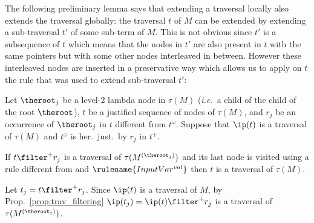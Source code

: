 The following preliminary lemma says that extending a traversal locally also extends the
traversal globally: the traversal $t$ of $M$ can be extended by
extending a sub-traversal $t'$ of some sub-term of $M$. This is
not obvious since $t'$ is a subsequence of $t$ which means that the
nodes in $t'$ are also present in $t$ with the same pointers but
with some other nodes interleaved in between. However these
interleaved nodes are inserted in a preservative way which allows us
to apply on $t$ the rule that was used to extend sub-traversal $t'$:
\begin{lemma}
\label{lem:subtraversal_progression} Let $\theroot_j$ be a level-$2$ lambda node in $\tau(M)$ ({\it i.e.}\ a child of the child of the root $\theroot$),
$t$ be a justified sequence of nodes of $\tau(M)$, and $r_j$ be an occurrence of $\theroot_j$ in $t$ different from $t^\omega$.
Suppose that $\ip(t)$ is a traversal of $\tau(M)$ and $t^\omega$ is her.\ just.\ by $r_j$ in $t^+$.

If $t \filter^+ r_j$ is a traversal of $\tau(M^{(\theroot_j)})$
and its last node is visited using a rule different from  and $\rulename{InputVar^{val}}$
then $t$ is a traversal of $\tau(M)$.
\end{lemma}
\proof
Let $t_j = t \filter^+ r_j$. Since $\ip(t)$ is a traversal of $M$, by Prop.\ \ref{prop:trav_filtering}
$\ip(t_j) = \ip(t) \filter^+ r_j$ is a traversal of $\tau(M^{(\theroot_j)})$.


